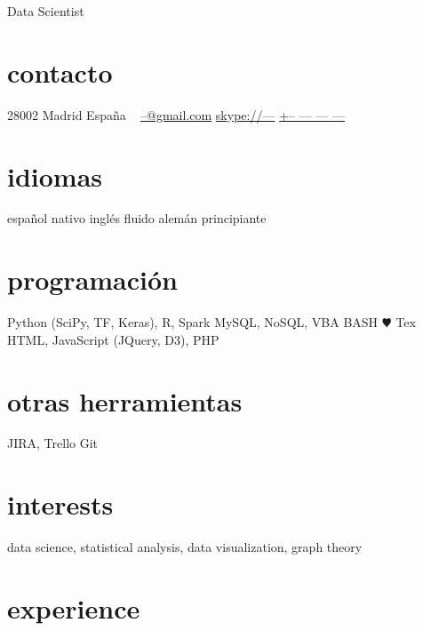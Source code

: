 \documentclass[]{friggeri-cv}
\begin{document}
\ifenglish
{}
       {Data Scientist}


\begin{aside}
  \section{contacto}
    28002 Madrid
    España
    ~
    \href{mailto:--@gmail.com}{--@gmail.com}
    \href{skype:<--->[add]}{skype://---}
    \href{tel:-------------}{+-- --- --- ---}
  \section{idiomas}
    español nativo
    inglés fluido
    alemán principiante
  \section{programación}
    Python (SciPy, TF, Keras), R, Spark
    MySQL, NoSQL, VBA
    BASH
    {\color{red} $\varheartsuit$} Tex
    HTML, JavaScript (JQuery, D3), PHP
  \section{otras herramientas}
    JIRA, Trello
    Git
\end{aside}

\section{interests}

data science, statistical analysis, data visualization, graph theory

\section{experience}
\end{document}
